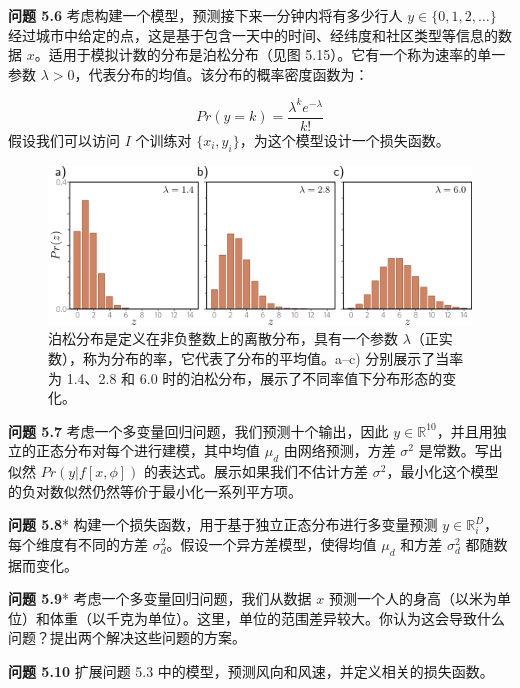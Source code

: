 \textbf{问题 5.6} 考虑构建一个模型，预测接下来一分钟内将有多少行人 \(y \in \{0, 1, 2, \ldots\}\) 经过城市中给定的点，这是基于包含一天中的时间、经纬度和社区类型等信息的数据 \(x\)。适用于模拟计数的分布是泊松分布（见图 5.15）。它有一个称为速率的单一参数 \(\lambda > 0\)，代表分布的均值。该分布的概率密度函数为：

\begin{equation}
Pr(y = k) = \frac{\lambda^k e^{-\lambda}}{k!} 
\end{equation}
假设我们可以访问 \(I\) 个训练对 \(\{x_i, y_i\}\)，为这个模型设计一个损失函数。

\begin{figure}[ht!]
	\centering
	\includegraphics[width=0.7\linewidth]{png/chapter5/LossPoisson.png}
	\caption{泊松分布是定义在非负整数上的离散分布，具有一个参数 \(\lambda\)（正实数），称为分布的率，它代表了分布的平均值。a–c) 分别展示了当率为 1.4、2.8 和 6.0 时的泊松分布，展示了不同率值下分布形态的变化。}
\end{figure}


\textbf{问题 5.7} 考虑一个多变量回归问题，我们预测十个输出，因此 \(y \in \mathbb{R}^{10}\)，并且用独立的正态分布对每个进行建模，其中均值 \(\mu_d\) 由网络预测，方差 \(\sigma^2\) 是常数。写出似然 \(Pr(y|f[x, \phi])\) 的表达式。展示如果我们不估计方差 \(\sigma^2\)，最小化这个模型的负对数似然仍然等价于最小化一系列平方项。

\textbf{问题 5.8}* 构建一个损失函数，用于基于独立正态分布进行多变量预测 \(y \in \mathbb{R}^D_i\)，每个维度有不同的方差 \(\sigma_d^2\)。假设一个异方差模型，使得均值 \(\mu_d\) 和方差 \(\sigma_d^2\) 都随数据而变化。

\textbf{问题 5.9}* 考虑一个多变量回归问题，我们从数据 \(x\) 预测一个人的身高（以米为单位）和体重（以千克为单位）。这里，单位的范围差异较大。你认为这会导致什么问题？提出两个解决这些问题的方案。

\textbf{问题 5.10} 扩展问题 5.3 中的模型，预测风向和风速，并定义相关的损失函数。

